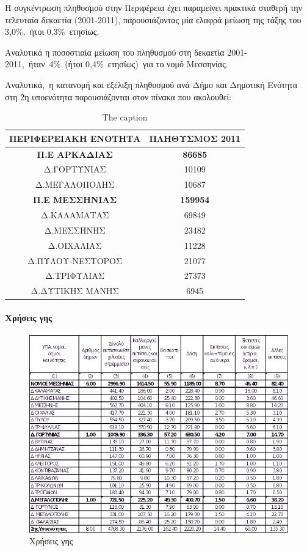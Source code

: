 \documentclass[12pt]{article}
\begin{document}
	Η συγκέντρωση πληθυσμού στην Περιφέρεια έχει παραμείνει πρακτικά σταθερή την τελευταία δεκαετία (2001-2011), παρουσιάζοντας μία ελαφρά μείωση της τάξης του 3,0\%, ήτοι 0,3\% ετησίως.
	
	Αναλυτικά η ποσοστιαία μείωση του πληθυσμού στη δεκαετία 2001-2011, ήταν 4\% (ήτοι 0,4\% ετησίως) για το νομό Μεσσηνίας.
	
	Αναλυτικά, η κατανομή και εξέλιξη πληθυσμού ανά Δήμο και Δημοτική Ενότητα στη 2η υποενότητα παρουσιάζονται στον πίνακα που ακολουθεί:
	
	\begin{table}[H]
		\centering
		\begin{tabular}{|c|c|}
			\hline
			\textbf{ΠΕΡΙΦΕΡΕΙΑΚΗ ΕΝΟΤΗΤΑ} & \textbf{ΠΛΗΘΥΣΜΟΣ 2011} \\ \hline
			\textbf{Π.Ε ΑΡΚΑΔΙΑΣ} & \textbf{86685} \\ \hline
			Δ.ΓΟΡΤΥΝΙΑΣ & 10109 \\ \hline
			Δ.ΜΕΓΑΛΟΠΟΛΗΣ & 10687 \\ \hline
			\textbf{Π.Ε ΜΕΣΣΗΝΙΑΣ} & \textbf{159954} \\ \hline
			Δ.ΚΑΛΑΜΑΤΑΣ & 69849 \\ \hline
			Δ.ΜΕΣΣΗΝΗΣ & 23482 \\ \hline
			Δ.ΟΙΧΑΛΙΑΣ & 11228 \\ \hline
			Δ.ΠΥΛΟΥ-ΝΕΣΤΟΡΟΣ & 21077 \\ \hline
			Δ.ΤΡΙΦΥΛΙΑΣ & 27373 \\ \hline
			Δ.ΔΥΤΙΚΗΣ ΜΑΝΗΣ & 6945 \\ \hline
		\end{tabular}
		\caption{The caption}
		\label{The label}
	\end{table}
	
	\paragraph{Χρήσεις γης}
	
	\begin{figure} [H]
		\begin{center}
			\includegraphics [scale = 0.80] {xriseis3.png}
			\caption{Χρήσεις γης}
		\end{center}
	\end{figure}
\end{document}
